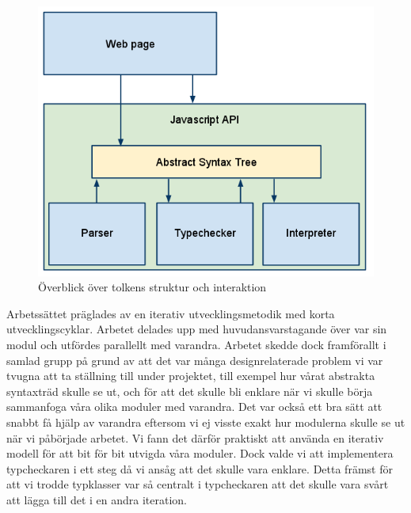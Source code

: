 \begin{figure}[h]
    \begin{center}
        \includegraphics[width=1.0\textwidth]{image1.png}
        \caption{Överblick över tolkens struktur och interaktion}
        \label{fig:tolkens_struktur} %
    \end{center}
\end{figure}


Arbetssättet präglades av en iterativ utvecklingsmetodik med korta utvecklingscyklar. Arbetet delades upp med huvudansvarstagande över var sin modul och utfördes parallellt med varandra. Arbetet skedde dock framförallt i samlad grupp på grund av att det var många designrelaterade problem vi var tvugna att ta ställning till under projektet, till exempel hur vårat abstrakta syntaxträd skulle se ut, och för att det skulle bli enklare när vi skulle börja sammanfoga våra olika moduler med varandra. 
Det var också ett bra sätt att snabbt få hjälp av varandra eftersom vi ej visste exakt hur modulerna skulle se ut när vi påbörjade arbetet. Vi fann det därför praktiskt att använda en iterativ modell för att bit för bit utvigda våra moduler. Dock valde vi att implementera typcheckaren i ett steg då vi ansåg att det skulle vara enklare. Detta främst för att vi trodde typklasser var så centralt i typcheckaren att det skulle vara svårt att lägga till det i en andra iteration. 

